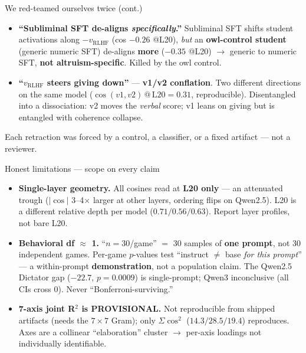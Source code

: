 \documentclass[aspectratio=169,11pt]{beamer}
\begin{document}
\begin{frame}{We red-teamed ourselves twice (cont.)}
  \begin{itemize}
    \item \textbf{``Subliminal SFT de-aligns \emph{specifically}.''} Subliminal
      SFT shifts student activations along $-v_{\text{RLHF}}$ (cos $-0.26$ @L20),
      \emph{but} an \textbf{owl-control student} (generic numeric SFT) de-aligns
      \textbf{more} ($-0.35$ @L20) $\to$ generic to numeric SFT, \textbf{not
      altruism-specific}. Killed by the owl control.
    \item \textbf{``$v_{\text{RLHF}}$ steers giving down''} --- \textbf{v1/v2
      conflation}. Two different directions on the same model
      ($\cos(v1,v2)\,@\,\text{L20} = 0.31$, reproducible). Disentangled into a
      dissociation: v2 moves the \emph{verbal} score; v1 leans on giving but is
      entangled with coherence collapse.
  \end{itemize}
  \footnotesize Each retraction was forced by a control, a classifier, or a
  fixed artifact --- not a reviewer.
\end{frame}

\begin{frame}{Honest limitations --- scope on every claim}
  \begin{itemize}
    \item \textbf{Single-layer geometry.} All cosines read at \textbf{L20 only}
      --- an attenuated trough ($|\cos|$ 3--4$\times$ larger at other layers,
      ordering flips on Qwen2.5). L20 is a different relative depth per model
      ($0.71/0.56/0.63$). Report layer profiles, not bare L20.
    \item \textbf{Behavioral df $\approx$ 1.} ``$n=30$/game'' $=$ 30 samples of
      \textbf{one prompt}, not 30 independent games. Per-game $p$-values test
      ``instruct $\neq$ base \emph{for this prompt}'' --- a within-prompt
      \textbf{demonstration}, not a population claim. The Qwen2.5 Dictator gap
      ($-22.7$, $p{=}0.0009$) is single-prompt; Qwen3 inconclusive (all CIs
      cross 0). Never ``Bonferroni-surviving.''
    \item \textbf{7-axis joint R$^2$ is PROVISIONAL.} Not reproducible from
      shipped artifacts (needs the $7{\times}7$ Gram); only $\Sigma\cos^2$
      ($14.3/28.5/19.4$) reproduces. Axes are a collinear ``elaboration''
      cluster $\to$ per-axis loadings not individually identifiable.
  \end{itemize}
\end{frame}
\end{document}
